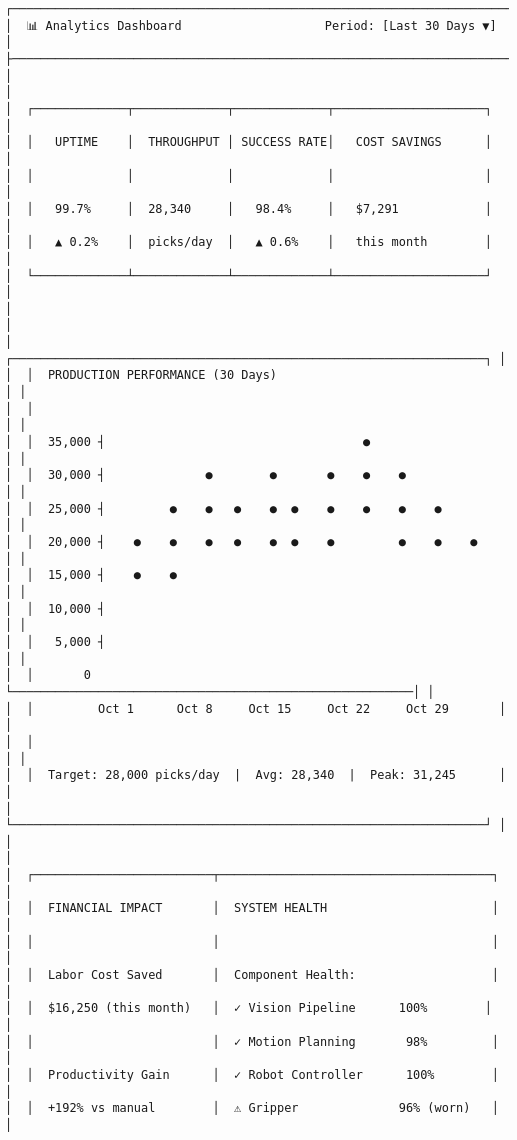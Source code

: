 \documentclass[
]{article}
\begin{document}
\begin{verbatim}
┌────────────────────────────────────────────────────────────────────────┐
│  📊 Analytics Dashboard                    Period: [Last 30 Days ▼]    │
├────────────────────────────────────────────────────────────────────────┤
│                                                                        │
│  ┌─────────────┬─────────────┬─────────────┬─────────────────────┐   │
│  │   UPTIME    │  THROUGHPUT │ SUCCESS RATE│   COST SAVINGS      │   │
│  │             │             │             │                     │   │
│  │   99.7%     │  28,340     │   98.4%     │   $7,291            │   │
│  │   ▲ 0.2%    │  picks/day  │   ▲ 0.6%    │   this month        │   │
│  └─────────────┴─────────────┴─────────────┴─────────────────────┘   │
│                                                                        │
│  ┌──────────────────────────────────────────────────────────────────┐ │
│  │  PRODUCTION PERFORMANCE (30 Days)                                │ │
│  │                                                                   │ │
│  │  35,000 ┤                                    ●                   │ │
│  │  30,000 ┤              ●        ●       ●    ●    ●              │ │
│  │  25,000 ┤         ●    ●   ●    ●  ●    ●    ●    ●    ●         │ │
│  │  20,000 ┤    ●    ●    ●   ●    ●  ●    ●         ●    ●    ●    │ │
│  │  15,000 ┤    ●    ●                                              │ │
│  │  10,000 ┤                                                         │ │
│  │   5,000 ┤                                                         │ │
│  │       0 └────────────────────────────────────────────────────────│ │
│  │         Oct 1      Oct 8     Oct 15     Oct 22     Oct 29       │ │
│  │                                                                   │ │
│  │  Target: 28,000 picks/day  |  Avg: 28,340  |  Peak: 31,245      │ │
│  └──────────────────────────────────────────────────────────────────┘ │
│                                                                        │
│  ┌─────────────────────────┬──────────────────────────────────────┐   │
│  │  FINANCIAL IMPACT       │  SYSTEM HEALTH                       │   │
│  │                         │                                      │   │
│  │  Labor Cost Saved       │  Component Health:                   │   │
│  │  $16,250 (this month)   │  ✓ Vision Pipeline      100%        │   │
│  │                         │  ✓ Motion Planning       98%         │   │
│  │  Productivity Gain      │  ✓ Robot Controller      100%        │   │
│  │  +192% vs manual        │  ⚠ Gripper              96% (worn)   │   │

\end{verbatim}
\end{document}
